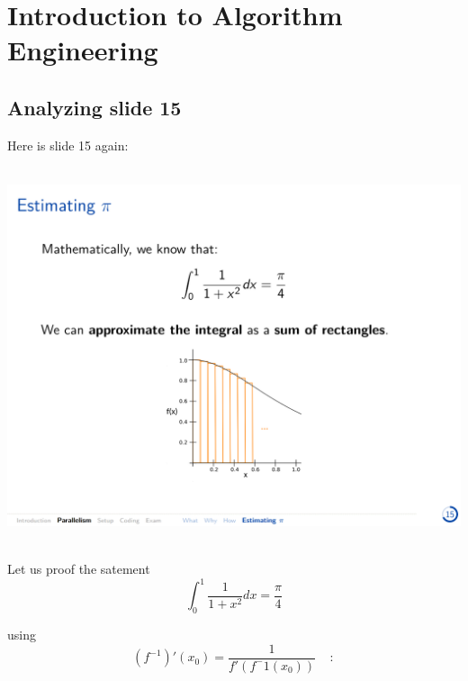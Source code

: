 \documentclass[../../main.tex]{subfiles}
\begin{document}
\section{Introduction to Algorithm Engineering}
\subsection{Analyzing slide 15}
Here is slide 15 again:

~\\
\includegraphics[width=\textwidth]{page_15.png}

~\\
Let us proof the satement
\[
    \int_{0}^{1}\frac{1}{1+x^2} dx = \frac{\pi}{4}
\]

\noindent using
\[
    (f^{-1})'(x_0) = \frac{1}{f'(f^-1(x_0))} \ \ \ \ \ :
\]
\end{document}
